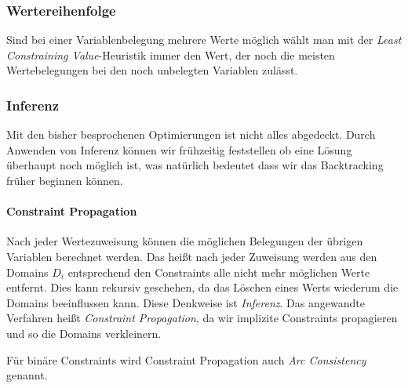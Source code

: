\subsubsection{Wertereihenfolge}
Sind bei einer Variablenbelegung mehrere Werte möglich wählt man mit der \emph{Least Constraining Value}-Heuristik immer den Wert, der noch die meisten Wertebelegungen bei den noch unbelegten Variablen zulässt.

\subsubsection{Inferenz}
Mit den bisher besprochenen Optimierungen ist nicht alles abgedeckt. Durch Anwenden von Inferenz können wir frühzeitig feststellen ob eine Lösung überhaupt noch möglich ist, was natürlich bedeutet dass wir das Backtracking früher beginnen können.
\paragraph{Constraint Propagation}
Nach jeder Wertezuweisung können die möglichen Belegungen der übrigen Variablen berechnet werden. Das heißt nach jeder Zuweisung werden aus den Domains $D_i$ entsprechend den Constraints alle nicht mehr möglichen Werte entfernt. Dies kann rekursiv geschehen, da das Löschen eines Werts wiederum die Domains beeinflussen kann.
Diese Denkweise ist \emph{Inferenz}. Das angewandte Verfahren heißt \emph{Constraint Propagation}, da wir implizite Constraints propagieren und so die Domains verkleinern.

Für binäre Constraints wird Constraint Propagation auch \emph{Arc Consistency} genannt.

